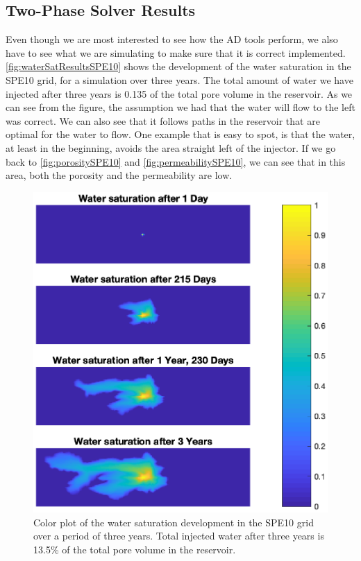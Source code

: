 \subsection{Two-Phase Solver Results}
Even though we are most interested to see how the AD tools perform, we also have to see what we are simulating to make sure that it is correct implemented. \autoref{fig:waterSatResultsSPE10} shows the development of the water saturation in the SPE10 grid, for a simulation over three years. The total amount of water we have injected after three years is 0.135 of the total pore volume in the reservoir. As we can see from the figure, the assumption we had that the water will flow to the left was correct. We can also see that it follows paths in the reservoir that are optimal for the water to flow. One example that is easy to spot, is that the water, at least in the beginning, avoids the area straight left of the injector. If we go back to \autoref{fig:porositySPE10} and \autoref{fig:permeabilitySPE10}, we can see that in this area, both the porosity and the permeability are low.
\begin{figure}
    \centering
    \includegraphics[width = .8\textwidth,clip=true, trim=100 30 100 10]{figures/waterSaturation4x1ThreeYears.eps}
    \caption{Color plot of the water saturation development in the SPE10 grid over a period of three years. Total injected water after three years is 13.5\% of the total pore volume in the reservoir.}
    \label{fig:waterSatResultsSPE10}
\end{figure}

